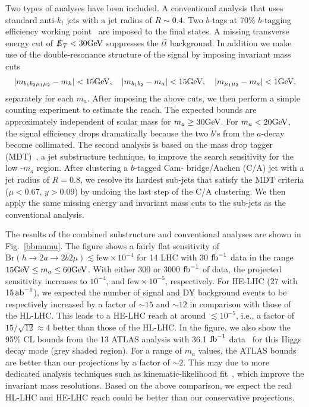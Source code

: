 Two types of analyses have been included. A conventional analysis that uses standard anti-$k_t$ jets with a jet radius of $R\sim 0.4$. Two $b$-tags at 70\% $b$-tagging efficiency working point~\cite{ATLAS:2014cal}  are imposed to the final states. A missing transverse energy cut of $\slashed{E}_T < 30 \text{GeV}$ suppresses the $t \bar t$ background. In addition we make use of the double-resonance structure of the signal by imposing invariant mass cuts 
\begin{align}
|m_{b_1 b_2 \mu_1 \mu_2}-m_h|< 15\text{GeV},\quad |m_{b_1 b_2}-m_a|< 15\text{GeV},\quad|m_{\mu_1\mu_2}-m_a| < 1\text{GeV},
\end{align}
separately for each $m_a$. After imposing the above cuts, we then perform a simple counting experiment to estimate the reach. The expected bounds are approximately independent of scalar mass for $m_a \geq 30 \text{GeV}$. For $m_a < 20 \text{GeV}$, the signal efficiency drops dramatically because the two $b$'s from the $a$-decay become collimated. The second analysis is based on the mass drop tagger (MDT)~\cite{Butterworth:2008sd}, a jet substructure technique, to improve the search sensitivity for the low -$m_a$ region. After clustering a $b$-tagged Cam- bridge/Aachen (C/A) jet with a jet radius of $R=0.8$, we resolve its hardest sub-jets that satisfy the MDT criteria ($\mu < 0.67$, $y>0.09$) by undoing the last step of the C/A clustering. We then apply the same missing energy and invariant mass cuts to the sub-jets as the conventional analysis.

The results of the combined substructure and conventional analyses are shown in Fig.~\ref{bbmumu}. The figure shows a fairly flat sensitivity of  $\mathrm{Br}(h \to 2a \to 2b2\mu) \lesssim \text{few}\times10^{-4}$ for 14 \UTeV LHC with 30 ${\rm fb}^{-1}$ data in the range $15\text{GeV} \leq m_a \leq 60 \text{GeV}$. With either 300 or 3000 ${\rm fb}^{-1}$ of data, the projected sensitivity increases to  $10^{-4}$, and $\text{few}\times 10^{-5}$, respectively. For HE-LHC (27 \UTeV with $15\mbox{\ensuremath{\,\text{ab}^\text{$-$1}}}$), we expected the number of signal and DY background events to be respectively increased by a factor of $\sim15$ and $\sim12$ in comparison with those of the HL-LHC. This leads to a HE-LHC reach at around $\lesssim 10^{-5}$, i.e., a factor of $15/\sqrt{12}\approx 4$ better than those of the HL-LHC. In the figure, we also show the 95\% CL bounds from the 13 \UTeV ATLAS analysis with 36.1 ${\rm fb}^{-1}$ data~\cite{Aaboud:2018esj} for this Higgs decay mode (grey shaded region). For a range of $m_a$ values, the ATLAS bounds are better than our projections  by a factor of $\sim 2$. This may due to more dedicated analysis techniques such as kinematic-likelihood fit~\cite{Aaboud:2018esj}, which improve the invariant mass resolutions. Based on the above comparison, we expect the real HL-LHC and HE-LHC reach could be better than our conservative projections. 



